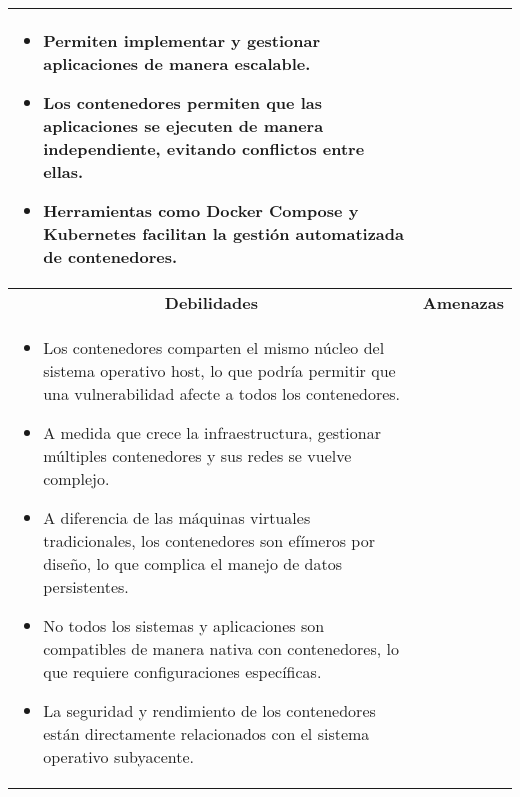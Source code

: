 \begin{table}[H]
\begin{tabularx}{\textwidth}{|X|X|}
\begin{minipage}[t]{\dimexpr\linewidth-8mm}
\begin{itemize}
    \item \hspace{5mm} Permiten implementar y gestionar aplicaciones de manera escalable.
    \item \hspace{5mm} Los contenedores permiten que las aplicaciones se ejecuten de manera independiente, evitando conflictos entre ellas.
    \item \hspace{5mm} Herramientas como Docker Compose y Kubernetes facilitan la gestión automatizada de contenedores.
\end{itemize}
\vspace{2pt}
\end{minipage}
\hspace{4mm} %
\\
\hline
\multicolumn{1}{|c|}{\textbf{Debilidades}} & \multicolumn{1}{c|}{\textbf{Amenazas}} \\
\hline
\begin{minipage}[t]{\dimexpr\linewidth-8mm} %
\vspace{2pt}
\begin{itemize}
    \setlength\itemsep{0pt}
    \setlength\parskip{0pt}
    \setlength\parsep{0pt}
    \item \hspace{5mm} Los contenedores comparten el mismo núcleo del sistema operativo host, lo que podría permitir que una vulnerabilidad afecte a todos los contenedores.
    \item \hspace{5mm} A medida que crece la infraestructura, gestionar múltiples contenedores y sus redes se vuelve complejo.
    \item \hspace{5mm} A diferencia de las máquinas virtuales tradicionales, los contenedores son efímeros por diseño, lo que complica el manejo de datos persistentes.
    \item \hspace{5mm} No todos los sistemas y aplicaciones son compatibles de manera nativa con contenedores, lo que requiere configuraciones específicas.
    \item \hspace{5mm} La seguridad y rendimiento de los contenedores están directamente relacionados con el sistema operativo subyacente.
\end{itemize}
\vspace{2pt}
\end{minipage}

\end{tabularx}
\end{table}
